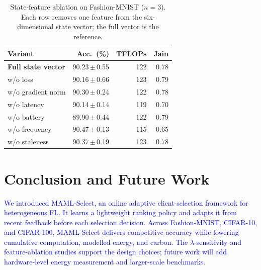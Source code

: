\documentclass[journal]{IEEEtran}
\newcommand{\revision}[1]{\textcolor{blue}{#1}}
\begin{document}
\begin{table}[!t]
\vspace{-8mm}
\centering
\caption{State-feature ablation on Fashion-MNIST ($n=3$). Each row removes one feature from the
six-dimensional state vector; the full vector is the reference.}
\label{tab:ablation}
\scriptsize
\setlength{\tabcolsep}{3.4pt}
\renewcommand{\arraystretch}{0.92}
\begin{tabular*}{\columnwidth}{@{\extracolsep{\fill}}lrrr@{}}
\toprule
Variant & Acc.\ (\%) & TFLOPs & Jain \\
\midrule
\textbf{Full state vector} & 90.23\,$\pm$\,0.55 & 122 & 0.78 \\
w/o loss & 90.16\,$\pm$\,0.66 & 123 & 0.79 \\
w/o gradient norm & 90.30\,$\pm$\,0.24 & 122 & 0.78 \\
w/o latency & 90.14\,$\pm$\,0.14 & 119 & 0.70 \\
w/o battery & 89.90\,$\pm$\,0.44 & 122 & 0.79 \\
w/o frequency & 90.47\,$\pm$\,0.13 & 115 & 0.65 \\
w/o staleness & 90.37\,$\pm$\,0.19 & 123 & 0.78 \\
\bottomrule
\end{tabular*}
\vspace{-2mm}
\end{table}


\FloatBarrier
\section{Conclusion and Future Work}
\revision{We introduced MAML-Select, an online adaptive client-selection framework for heterogeneous FL. It learns a lightweight ranking policy and adapts it from recent feedback before each selection decision. Across Fashion-MNIST, CIFAR-10, and CIFAR-100, MAML-Select delivers competitive accuracy while lowering cumulative computation, modelled energy, and carbon. The $\lambda$-sensitivity and feature-ablation studies support the design choices; future work will add hardware-level energy measurement and larger-scale benchmarks.}

\vspace{-1mm}
{\scriptsize


}
\end{document}
